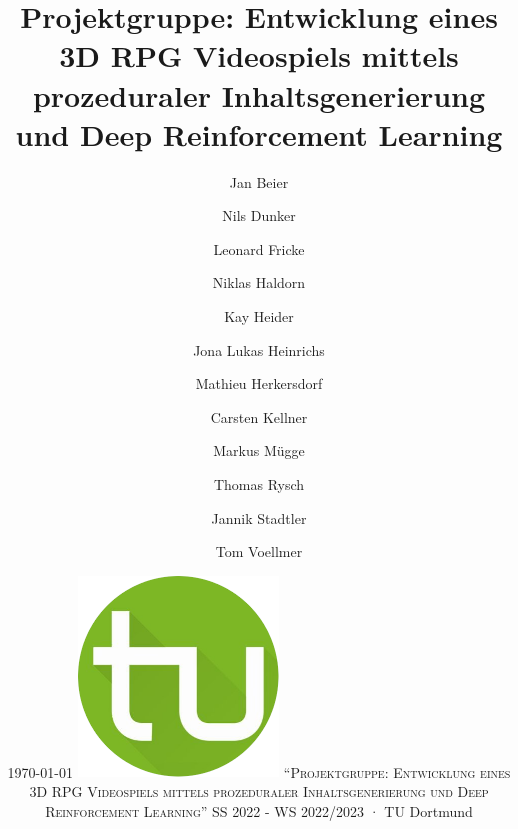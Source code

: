 %
%
\newcommand\svperson{Jan Beier, Nils Dunker, Leonard Fricke, Niklas Haldorn, Kay Heider, \linebreak Jona Lukas Heinrichs, Mathieu Herkersdorf, Carsten Kellner, Markus Mügge, Thomas Rysch, Jannik Stadtler, Tom Voellmer}
\newcommand\svdatum{\today} %
\newcommand\lvname{Projektgruppe: Entwicklung eines 3D RPG Videospiels mittels prozeduraler Inhaltsgenerierung und Deep Reinforcement Learning}
\newcommand\lvtyp{SS 2022 - WS 2022/2023}
\newcommand\lvinst{TU Dortmund}



	
	\title{ \huge\textbf{Projektgruppe: \linebreak \linebreak Entwicklung eines 3D RPG Videospiels mittels prozeduraler Inhaltsgenerierung und Deep Reinforcement Learning} }
	\author{Jan Beier \and Nils Dunker \and Leonard Fricke \and Niklas Haldorn \and Kay Heider \and Jona Lukas Heinrichs \and Mathieu Herkersdorf \and Carsten Kellner \and Markus Mügge \and Thomas Rysch \and Jannik Stadtler \and Tom Voellmer}
	\date{\LARGE{\svdatum} \linebreak \linebreak \normalsize \centering \includegraphics[width=0.4\textwidth]{resources/img/tu-dortmund.png} \linebreak \linebreak \large\textsc{"`\lvname"'} \linebreak \linebreak \large{\lvtyp} · \large{\lvinst}}
	
	\maketitle
	\thispagestyle{empty} %

